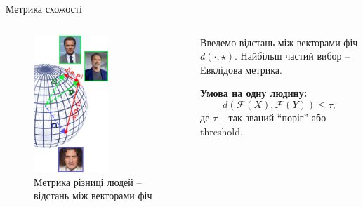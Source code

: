 \documentclass{zkdl-presentation-template}
\begin{document}
    \begin{frame}{Метрика схожості}

    \begin{columns}
        \begin{column}{0.5\textwidth}
        \begin{figure}
        \centering
            \includegraphics[width=0.6\textwidth]{images/hypersphere_dist.png}
            \caption{Метрика різниці людей -- відстань між векторами фіч}
        \end{figure}
        \end{column}

        \begin{column}{0.5\textwidth}
            Введемо відстань між векторами фіч $d(\cdot,\star)$. Найбільш частий вибор -- Евклідова метрика. 
        
            \textbf{Умова на одну людину:}
            \begin{equation*}
                \boxed{d(\mathcal{F}(X),\mathcal{F}(Y)) \leq \tau},
            \end{equation*}
            де $\tau$ -- так званий ``поріг'' або threshold.
        \end{column}
    \end{columns}
    \end{frame}
\end{document}

